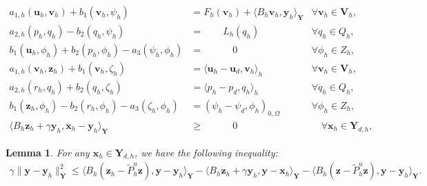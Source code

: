 \documentclass[10pt,a4paper]{amsart}
\newtheorem{lemma}{Lemma}
\newcommand\bV{\mathbf{V}}
\newcommand{\bY}{\boldsymbol{Y}}
\newcommand\bu{\boldsymbol{u}}
\newcommand\bv{\boldsymbol{v}}
\newcommand\bx{\boldsymbol{x}}
\newcommand\by{\boldsymbol{y}}
\newcommand\bz{\boldsymbol{z}}
\newcommand{\tP}{\tilde{P}}
\begin{document}
		\begin{align}
			a_{1,h}(\bu_h, \bv_h) + b_1(\bv_h, \psi_h) &= F_h(\bv_h) + \langle B_h \bv_h, \by_h \rangle_{\bY}  & \forall \bv_h \in \bV_h, \\
			a_{2,h}(p_h, q_h) - b_2(q_h, \psi_h) & =  \qquad L_h(q_h)  & \forall q_h \in Q_h, \\
			b_1(\bu_h, \phi_h) + b_2(p_h, \phi_h) - a_3(\psi_h, \phi_h) & = \qquad \quad 0  & \forall \phi_h \in Z_h, \\
			a_{1,h}(\bv_h, \bz_h) + b_1(\bv_h, \zeta_h) &= \langle \bu_h - \bu_d, \bv_h \rangle_h  & \forall \bv_h \in \bV_h, \\
			a_{2,h}(r_h, q_h) + b_2(q_h, \zeta_h) & = \langle p_h - p_d, q_h \rangle_h & \forall q_h \in Q_h, \\
			b_1(\bz_h, \phi_h) - b_2(r_h, \phi_h) - a_3(\zeta_h, \phi_h) & = ( \psi_h - \psi_d, \phi_h )_{0, \Omega}  & \forall \phi_h \in Z_h, \\
			\langle B_h \bz_h+ \gamma \by_h, \bx_h - \by_h \rangle_{\bY} & \ge  \qquad \quad 0 &\quad \forall \bx_h \in \bY_{d,h},  \label{eq:optimality-h}
		\end{align}

\begin{lemma} \label{lem:est-bound-h}
	For any $\bx_h \in \bY_{d,h}$, we have the following inequality:
	\begin{align*}
		\gamma \| \by - \by_h \|_{\bY}^2  \le \langle B_h (\bz_h - \tP_h^u \bz), \by - \by_h \rangle_{\bY} -  \langle B_h \bz_h + \gamma \by_h, \by - \bx_h \rangle_{\bY} - \langle B_h( \bz - \tP_h^u \bz), \by - \by_h \rangle_{\bY}.
	\end{align*}
\end{lemma}
\end{document}
